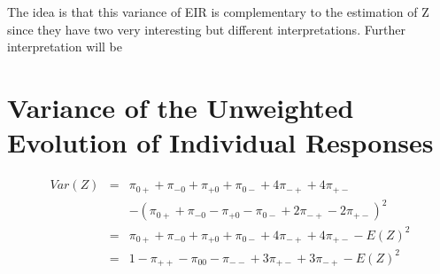 \documentclass[12pt,a4paper,oneside]{book}
\begin{document}

The idea is that this variance of EIR is complementary to the estimation of Z since they have two very interesting but different interpretations.
Further interpretation will be 

\section{Variance of the Unweighted Evolution of Individual Responses}




\begin{eqnarray}
Var(Z) &=& \pi_{0+} + \pi_{-0} + \pi_{+0} + \pi_{0-} +4\pi_{-+} +4\pi_{+-} \nonumber \nonumber \\ 
&&    - (\pi_{0+} + \pi_{-0} - \pi_{+0} - \pi_{0-} +2\pi_{-+} -2\pi_{+-})^2 \nonumber \\
&=& \pi_{0+} + \pi_{-0} + \pi_{+0} + \pi_{0-} +4\pi_{-+} +4\pi_{+-} - E(Z)^2 \nonumber \\
&=& 1 - \pi_{++} - \pi_{00} - \pi_{--} + 3\pi_{+-} + 3\pi_{-+} - E(Z)^2
\end{eqnarray}
\end{document}
